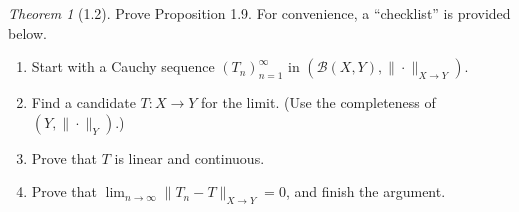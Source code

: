 \documentclass[12pt]{article}
\theoremstyle{remark}
\theoremstyle{named}
\newtheorem*{theorem}{Theorem}
\begin{document}
\newpage
\begin{theorem}[1.2]
    Prove Proposition 1.9. For convenience, a ``checklist'' is provided below.
    \begin{enumerate}
        \item Start with a Cauchy sequence \((T_n)_{n = 1}^\infty\) in \((\mathcal B (X, Y), \|\cdot\|_{X \to Y})\).
        \item Find a candidate \(T : X \to Y\) for the limit. (Use the completeness of \((Y, \|\cdot\|_Y)\).)
        \item Prove that \(T\) is linear and continuous.
        \item Prove that \(\lim_{n \to \infty} \|T_n - T\|_{X \to Y} = 0\), and finish the argument.
    \end{enumerate}
\end{theorem}
\end{document}

